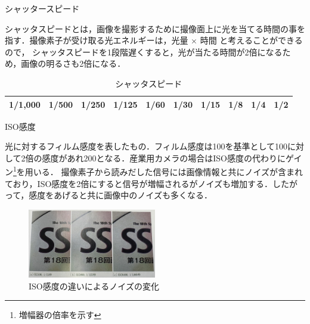 \documentclass[8pt, jfont=ipaexm, t]{beamer} %
\begin{document}
\begin{frame}{シャッタースピード}
  \begin{block}{}
    シャッタスピードとは，画像を撮影するために撮像面上に光を当てる時間の事を指す．撮像素子が受け取る光エネルギーは，光量 $\times$ 時間 と考えることができるので，
    シャッタスピードを1段階遅くすると，光が当たる時間が2倍になるため，画像の明るさも2倍になる．
  \end{block}
  \begin{table}[h]
    \centering
    \caption{シャッタスピード}
    \begin{tabular}{|c|c|c|c|c|c|c|c|c|c|}
      \hline
      1/1,000 & 1/500 & 1/250 & 1/125 & 1/60 & 1/30 & 1/15 & 1/8 & 1/4 & 1/2 \\
      \hline
    \end{tabular}
  \end{table}
\end{frame}

\begin{frame}{ISO感度}
  \begin{block}{}
    光に対するフィルム感度を表したもの．フィルム感度は100を基準として100に対して2倍の感度があれ200となる．産業用カメラの場合はISO感度の代わりにゲイン\footnote{増幅器の倍率を示す}を用いる．
    撮像素子から読みだした信号には画像情報と共にノイズが含まれており，ISO感度を2倍にすると信号が増幅されるがノイズも増加する．したがって，感度をあげると共に画像中のノイズも多くなる．
  \end{block}
  \begin{figure}[htbp]
      \centering
      \includegraphics[keepaspectratio,width=0.5\textwidth]{figure/013.jpg}
      \caption{ISO感度の違いによるノイズの変化}
      \label{fig:label}
  \end{figure}
\end{frame}
\end{document}
